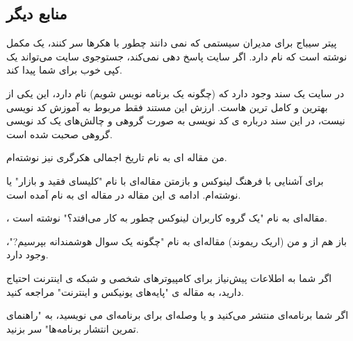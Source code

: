 \subsection*{منابع دیگر}
پیتر سیباج
 برای مدیران سیستمی که نمی دانند چطور با هکرها سر کنند، یک 
مکمل نوشته است که
نام دارد. اگر سایت 
پاسخ دهی نمی‌کند، جستوجوی سایت 
می‌تواند یک کپی خوب برای شما پیدا کند.

در سایت  یک سند وجود دارد
 که 
(چگونه یک برنامه نویس شویم) نام دارد، این یکی از بهترین و کامل ترین هاست. ارزش این مستند فقط مربوط به آموزش کد نویسی نیست، در این سند درباره ی کد نویسی به صورت گروهی و چالش‌های یک کد نویسی گروهی صحبت شده است.

من مقاله ای به نام تاریخ اجمالی هکرگری
 نیز نوشته‌ام.
 
برای آشنایی با فرهنگ لینوکس و بازمتن مقاله‌ای با نام "کلیسای فقید و بازار"
 یا  نوشته‌ام. ادامه ی این مقاله در مقاله ای به نام 
آمده است.

، مقاله‌ای به نام
"یک گروه کاربران لینوکس چطور به کار می‌افتد؟"
نوشته است.

باز هم از 
 و من (اریک ریموند) مقاله‌ای به نام "چگونه یک سوال هوشمندانه بپرسیم?"، 
 وجود دارد.

اگر شما به اطلاعات پیش‌نیاز برای کامپیوتر‌های شخصی و شبکه ی اینترنت احتیاج دارید، به مقاله ی "پایه‌های یونیکس و اینترنت"  مراجعه کنید.

اگر شما برنامه‌ای منتشر می‌کنید و یا وصله‌ای برای برنامه‌ای می نویسید، به "راهنمای تمرین انتشار برنامه‌ها"
سر بزنید.


